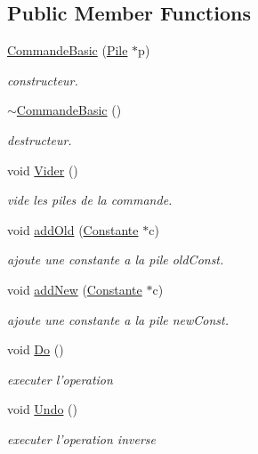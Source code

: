 \subsection*{Public Member Functions}
\begin{DoxyCompactItemize}
\item 
\hyperlink{class_commande_basic_a06896fb033075c9ad816cdc054cffa7c}{Commande\-Basic} (\hyperlink{class_pile}{Pile} $\ast$p)
\begin{DoxyCompactList}\small\item\em constructeur. \end{DoxyCompactList}\item 
\hyperlink{class_commande_basic_a0e14f93e2dac91cf302ab1eeefd72efc}{$\sim$\-Commande\-Basic} ()
\begin{DoxyCompactList}\small\item\em destructeur. \end{DoxyCompactList}\item 
\hypertarget{class_commande_basic_ad249aebd20fc1e2971daa3c1b915920c}{void \hyperlink{class_commande_basic_ad249aebd20fc1e2971daa3c1b915920c}{Vider} ()}\label{class_commande_basic_ad249aebd20fc1e2971daa3c1b915920c}

\begin{DoxyCompactList}\small\item\em vide les piles de la commande. \end{DoxyCompactList}\item 
void \hyperlink{class_commande_basic_aee8cf6044f00f87f26995ab28bfa5e91}{add\-Old} (\hyperlink{class_constante}{Constante} $\ast$c)
\begin{DoxyCompactList}\small\item\em ajoute une constante a la pile old\-Const. \end{DoxyCompactList}\item 
void \hyperlink{class_commande_basic_aedeb00c48e9990847cf54753acb93d7e}{add\-New} (\hyperlink{class_constante}{Constante} $\ast$c)
\begin{DoxyCompactList}\small\item\em ajoute une constante a la pile new\-Const. \end{DoxyCompactList}\item 
void \hyperlink{class_commande_basic_a1a0e1350aa80995f26dec83e56cb27e7}{Do} ()
\begin{DoxyCompactList}\small\item\em executer l'operation \end{DoxyCompactList}\item 
void \hyperlink{class_commande_basic_ab5c5afa269142fc2aa49987b7ae31601}{Undo} ()
\begin{DoxyCompactList}\small\item\em executer l'operation inverse \end{DoxyCompactList}\end{DoxyCompactItemize}


